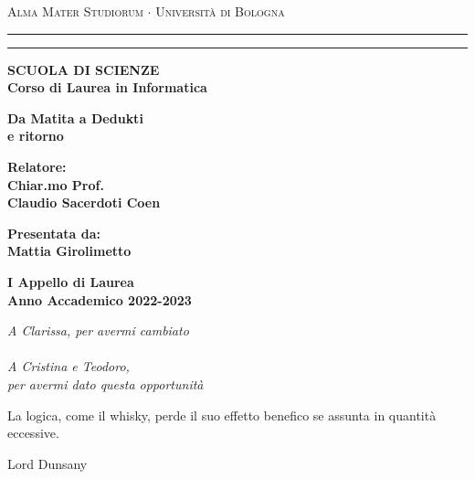 \documentclass[12pt,a4paper]{mimosis}
\begin{document}
\begin{titlepage}
  \begin{center}
    {{
      \Large{\textsc{Alma Mater Studiorum $\cdot$ Universit\`a di Bologna}}
    }} \rule[0.1cm]{15.8cm}{0.1mm}
    \rule[0.5cm]{15.8cm}{0.6mm}
    {\small{\bf SCUOLA DI SCIENZE\\
    Corso di Laurea in Informatica}}
  \end{center}
  \vspace{15mm}
  \begin{center}
    {\LARGE{\bf Da Matita a Dedukti}}\\
    \vspace{3mm}
    {\LARGE{\bf e ritorno}}\\
  \end{center}
  \vspace{40mm}
  \par
  \noindent
  \begin{minipage}[t]{0.47\textwidth}
  {\large{\bf Relatore:\\
  Chiar.mo Prof.\\ 
  Claudio Sacerdoti Coen}}
  \end{minipage}
  \hfill
  \begin{minipage}[t]{0.47\textwidth}\raggedleft
  {\large{\bf Presentata da:\\
  Mattia Girolimetto}}
  \end{minipage}
  \vspace{20mm}
  \begin{center}
  {\large{\bf I Appello di Laurea\\%
  Anno Accademico 2022-2023}}%
  \end{center}
\end{titlepage}

\begin{titlepage}
	\thispagestyle{empty}
	\topmargin=6.5cm
	\raggedleft
	\large
	\em
	A Clarissa, per avermi cambiato\\
  ~ \\
	A Cristina e Teodoro, \\ per avermi dato questa opportunità
	\newpage
	\clearpage{\pagestyle{empty}\cleardoublepage}
\end{titlepage}


\begin{titlepage}
	\thispagestyle{empty}
	\topmargin=6.5cm
	\raggedleft
	\large
	\em
  \epigraph{
    
La logica, come il whisky, perde il suo effetto benefico se assunta in quantità
  eccessive.
    }
  {Lord Dunsany}
	\clearpage{\pagestyle{empty}\cleardoublepage}
\end{titlepage}
\end{document}
